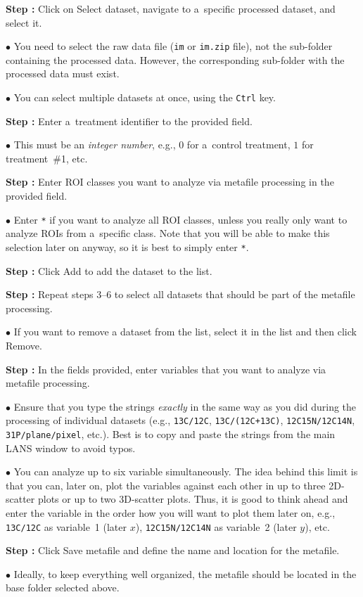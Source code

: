 \documentclass[a4paper, 11pt]{article}
\newcommand{\ttt}[1]{\texttt{#1}}
\newcommand{\lans}[1]{{\color{magenta}#1}}
\newcommand{\lanstf}[1]{{\color{cyan}#1}}
\newcounter{step}
\newcommand\s{\addtocounter{step}{1}\noindent\textbf{Step \thestep:}{ }}
\newcommand\bul{\noindent$\bullet${ }}
\begin{document}
\s Click on \lans{Select dataset}, navigate to a~specific processed dataset, and select it.

\bul You need to select the raw data file (\ttt{im} or \ttt{im.zip} file), not the sub-folder containing the processed data. However, the corresponding sub-folder with the processed data must exist.

\bul You can select multiple datasets at once, using the \ttt{Ctrl} key. 

\s Enter a~\lanstf{treatment identifier} to the provided field.

\bul This must be an \emph{integer number}, e.g., $0$ for a~control treatment, $1$ for treatment~\#1, etc.

\s Enter \lanstf{ROI classes} you want to analyze via metafile processing in the provided field.

\bul Enter \ttt{*} if you want to analyze all ROI classes, unless you really only want to analyze ROIs from a~specific class. Note that you will be able to make this selection later on anyway, so it is best to simply enter \ttt{*}.

\s Click \lans{Add} to add the dataset to the list. 

\s Repeat steps 3--6 to select all datasets that should be part of the metafile processing.

\bul If you want to remove a dataset from the list, select it in the list and then click \lans{Remove}.

\s In the fields provided, enter \lanstf{variables} that you want to analyze via metafile processing. 

\bul Ensure that you type the strings \emph{exactly} in the same way as you did during the processing of individual datasets (e.g., \ttt{13C/12C}, \ttt{13C/(12C+13C)}, \ttt{12C15N/12C14N}, \ttt{31P/plane/pixel}, etc.). Best is to copy and paste the strings from the main LANS window to avoid typos.

\bul You can analyze up to six variable simultaneously. The idea behind this limit is that you can, later on, plot the variables against each other in up to three 2D-scatter plots or up to two 3D-scatter plots. Thus, it is good to think ahead and enter the variable in the order how you will want to plot them later on, e.g., \ttt{13C/12C} as variable~1 (later $x$), \ttt{12C15N/12C14N} as variable~2 (later $y$), etc.

\s Click \lans{Save metafile} and define the name and location for the metafile.

\bul Ideally, to keep everything well organized, the metafile should be located in the \lanstf{base folder} selected above. 
\end{document}
